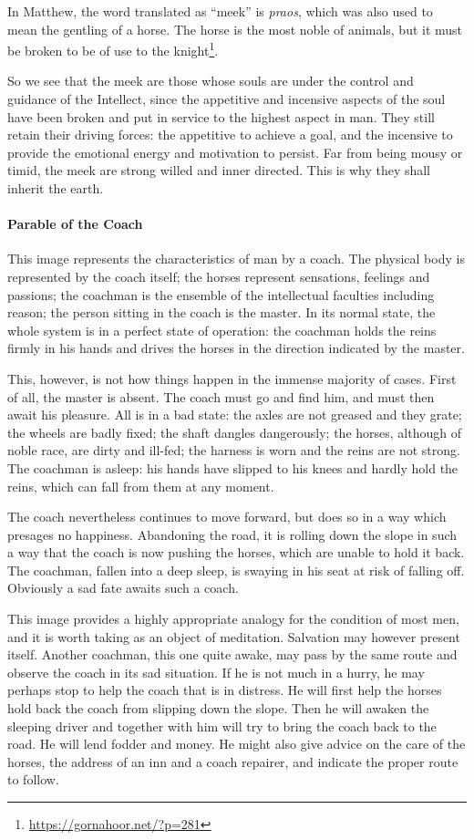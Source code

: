 In Matthew, the word translated as ``meek'' is \emph{praos}, which was also used to mean the gentling of a horse. The horse is the most noble of animals, but it must be broken to be of use to the knight\footnote{\url{https://gornahoor.net/?p=281}}.

So we see that the meek are those whose souls are under the control and guidance of the Intellect, since the appetitive and incensive aspects of the soul have been broken and put in service to the highest aspect in man. They still retain their driving forces: the appetitive to achieve a goal, and the incensive to provide the emotional energy and motivation to persist. Far from being mousy or timid, the meek are strong willed and inner directed. This is why they shall inherit the earth.

\paragraph{Parable of the Coach} This image represents the characteristics of man by a coach. The physical body is represented by the coach itself; the horses represent sensations, feelings and passions; the coachman is the ensemble of the intellectual faculties including reason; the person sitting in the coach is the master. In its normal state, the whole system is in a perfect state of operation: the coachman holds the reins firmly in his hands and drives the horses in the direction indicated by the master.

This, however, is not how things happen in the immense majority of cases. First of all, the master is absent. The coach must go and find him, and must then await his pleasure. All is in a bad state: the axles are not greased and they grate; the wheels are badly fixed; the shaft dangles dangerously; the horses, although of noble race, are dirty and ill-fed; the harness is worn and the reins are not strong. The coachman is asleep: his hands have slipped to his knees and hardly hold the reins, which can fall from them at any moment.

The coach nevertheless continues to move forward, but does so in a way which presages no happiness. Abandoning the road, it is rolling down the slope in such a way that the coach is now pushing the horses, which are unable to hold it back. The coachman, fallen into a deep sleep, is swaying in his seat at risk of falling off. Obviously a sad fate awaits such a coach.

This image provides a highly appropriate analogy for the condition of most men, and it is worth taking as an object of meditation. Salvation may however present itself. Another coachman, this one quite awake, may pass by the same route and observe the coach in its sad situation. If he is not much in a hurry, he may perhaps stop to help the coach that is in distress. He will first help the horses hold back the coach from slipping down the slope. Then he will awaken the sleeping driver and together with him will try to bring the coach back to the road. He will lend fodder and money. He might also give advice on the care of the horses, the address of an inn and a coach repairer, and indicate the proper route to follow.

